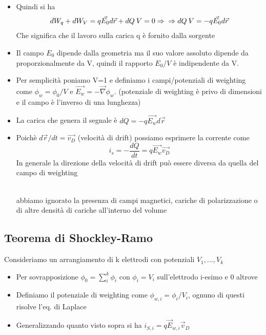 \begin{itemize}
\item Quindi si ha
  $$
  dW_q+dW_V=q\vec{E_0} d\vec{r}+dQ \: V=0 \implies 
  \\
  \implies dQ \: V = -q\vec{E_0} d\vec{r}
  $$
  Che significa che il lavoro sulla carica q è fornito dalla sorgente 

\item Il campo $E_0$ dipende dalla geometria ma il suo valore assoluto dipende da proporzionalmente da V, quindi il rapporto $E_0/V$ è indipendente da V.

\item Per semplicità poniamo V=1 e definiamo i campi/potenziali di weighting come $\phi_w=\phi_0/V$ e $\vec{E_w}=-\vec{\nabla}\phi_w$. (potenziale di weighting è privo di dimensioni e il campo è l'inverso di una lunghezza)

\item La carica che genera il segnale è $dQ=-q\vec{E_w}d\vec{r}$

\item Poichè $d\vec{r}/dt=\vec{v_D}$ (velocità di drift) possiamo esprimere la corrente come
  $$
  i_s=-\frac{dQ}{dt}=q\vec{E_w}\vec{v_D}
  $$
  In generale la direzione della velocità di drift può essere diversa da quella del campo di weighting

\begin{note}[Approssimazione]\hfill \\ 
    abbiamo ignorato la presenza di campi magnetici, cariche di polarizzazione o di altre densità di cariche all'interno del volume
\end{note}

\end{itemize}

\subsection{Teorema di Shockley-Ramo}

Consideriamo un arrangiamento di k elettrodi con potenziali $V_1,... , V_k$
\begin{itemize}
    \item Per sovrapposizione $\phi_0 = \sum_i^k\phi_i$ con $\phi_i=V_i$ sull'elettrodo i-esimo e 0 altrove
\item Definiamo il potenziale di weighting come $\phi_{w,i}=\phi_i/V_i$, ognuno di questi risolve l'eq. di Laplace
\item Generalizzando quanto visto sopra si ha $i_{S,i}=q\vec{E}_{w,i}\vec{v}_D$
\end{itemize}




